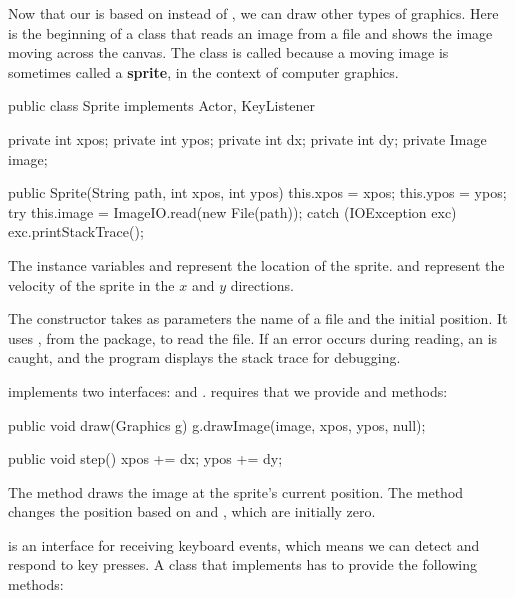 
Now that our  is based on  instead of , we can draw other types of graphics.
Here is the beginning of a class that reads an image from a file and shows the image moving across the canvas.
The class is called  because a moving image is sometimes called a {\bf sprite}, in the context of computer graphics.

\begin{code}
public class Sprite implements Actor, KeyListener {
    private int xpos;
    private int ypos;
    private int dx;
    private int dy;
    private Image image;

    public Sprite(String path, int xpos, int ypos) {
        this.xpos = xpos;
        this.ypos = ypos;
        try {
            this.image = ImageIO.read(new File(path));
        } catch (IOException exc) {
            exc.printStackTrace();
        }
    }
}
\end{code}

The instance variables  and  represent the location of the sprite.
 and  represent the velocity of the sprite in the $x$ and $y$ directions.

The constructor takes as parameters the name of a file and the initial position.
It uses  , from the  package, to read the file.
If an error occurs during reading, an  is caught, and the program displays the stack trace for debugging.

 implements two interfaces:  and .
 requires that we provide  and  methods:

\begin{code}
    public void draw(Graphics g) {
        g.drawImage(image, xpos, ypos, null);
    }

    public void step() {
        xpos += dx;
        ypos += dy;
    }
\end{code}

The  method draws the image at the sprite's current position.
The  method changes the position based on  and , which are initially zero.

 is an interface for receiving keyboard events, which means we can detect and respond to key presses.
A class that implements  has to provide the following methods:

